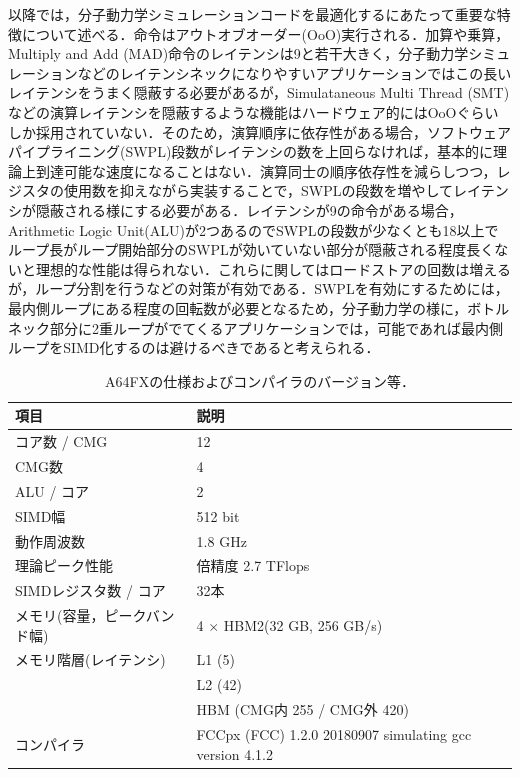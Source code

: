 \documentclass[uplatex,11pt,a4j,titlepage,oneside,openright,dvipdfmx]{jsbook}
\begin{document}
 以降では，分子動力学シミュレーションコードを最適化するにあたって重要な特徴について述べる．命令はアウトオブオーダー(OoO)実行される．加算や乗算，Multiply and Add (MAD)命令のレイテンシは9と若干大きく，分子動力学シミュレーションなどのレイテンシネックになりやすいアプリケーションではこの長いレイテンシをうまく隠蔽する必要があるが，Simulataneous Multi Thread (SMT)などの演算レイテンシを隠蔽するような機能はハードウェア的にはOoOぐらいしか採用されていない．そのため，演算順序に依存性がある場合，ソフトウェアパイプライニング(SWPL)段数がレイテンシの数を上回らなければ，基本的に理論上到達可能な速度になることはない．演算同士の順序依存性を減らしつつ，レジスタの使用数を抑えながら実装することで，SWPLの段数を増やしてレイテンシが隠蔽される様にする必要がある．レイテンシが9の命令がある場合，Arithmetic Logic Unit(ALU)が2つあるのでSWPLの段数が少なくとも18以上でループ長がループ開始部分のSWPLが効いていない部分が隠蔽される程度長くないと理想的な性能は得られない．これらに関してはロードストアの回数は増えるが，ループ分割を行うなどの対策が有効である．SWPLを有効にするためには，最内側ループにある程度の回転数が必要となるため，分子動力学の様に，ボトルネック部分に2重ループがでてくるアプリケーションでは，可能であれば最内側ループをSIMD化するのは避けるべきであると考えられる．

 \begin{table}
  \caption{A64FXの仕様およびコンパイラのバージョン等．}
  \label{tab:A64FX}
  \begin{tabular}{l|l}
   \hline \hline
   項目 & 説明 \\ \hline
   コア数 / CMG & 12\\
   CMG数 & 4 \\
   ALU / コア & 2 \\
   SIMD幅 & 512 bit \\
   動作周波数 & 1.8 GHz \\
   理論ピーク性能 & 倍精度 2.7 TFlops \\
   SIMDレジスタ数 / コア& 32本 \\
   メモリ(容量，ピークバンド幅) & 4 $\times$ HBM2(32 GB, 256 GB/s)\\
   メモリ階層(レイテンシ) & L1 (5) \\%
   & L2 (42)\\
   & HBM (CMG内 255 / CMG外 420)\\
   コンパイラ & FCCpx (FCC) 1.2.0 20180907 simulating gcc version 4.1.2 \\
   \hline \hline
  \end{tabular}
 \end{table}
\end{document}
